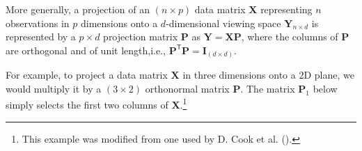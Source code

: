\documentclass[
  letterpaper,
  10pt,
  krantz2]{krantz}
\begin{document}
{More generally, a projection of an \((n \times p)\) data matrix
\(\mathbf{X}\) representing \(n\) observations in \(p\) dimensions onto
a \(d\)-dimensional viewing space \(\mathbf{Y}_{n \times d}\) is
represented by a \(p \times d\) projection matrix \(\mathbf{P}\) as
\(\mathbf{Y} = \mathbf{X} \mathbf{P}\), where the columns of
\(\mathbf{P}\) are orthogonal and of unit length,i.e.,
\(\mathbf{P}^\textsf{T} \mathbf{P} = \mathbf{I}_{(d \times d)}\).

For example, to project a data matrix \(\mathbf{X}\) in three dimensions
onto a 2D plane, we would multiply it by a \((3 \times 2)\) orthonormal
matrix \(\mathbf{P}\). The matrix \(\mathbf{P}_1\) below simply selects
the first two columns of \(\mathbf{X}\).\footnote{This example was
  modified from one used by D. Cook et al.
  ().}

}
\end{document}
